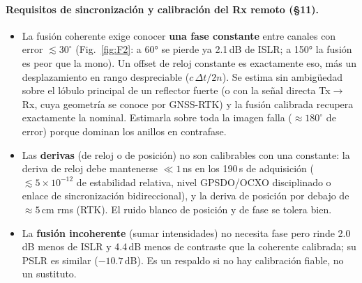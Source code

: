 \paragraph{Requisitos de sincronización y calibración del Rx remoto (§11).}
\begin{itemize}[itemsep=2pt]
  \item La fusión coherente exige conocer \textbf{una fase constante} entre
  canales con error $\lesssim30^{\circ}$ (Fig.~\ref{fig:F2}: a 60° se pierde ya
  2.1\,dB de ISLR; a 150° la fusión es peor que la mono). Un offset de reloj
  constante es exactamente eso, más un desplazamiento en rango despreciable
  ($c\,\Delta t/2n$). Se estima sin ambigüedad sobre el lóbulo principal de un
  reflector fuerte (o con la señal directa Tx$\to$Rx, cuya geometría se conoce por
  GNSS-RTK) y la fusión calibrada recupera exactamente la nominal. Estimarla sobre
  toda la imagen falla ($\approx180^{\circ}$ de error) porque dominan los anillos en
  contrafase.
  \item Las \textbf{derivas} (de reloj o de posición) no son calibrables con una
  constante: la deriva de reloj debe mantenerse $\ll1$\,ns en los 190\,s de
  adquisición ($\lesssim5\times10^{-12}$ de estabilidad relativa, nivel
  GPSDO/OCXO disciplinado o enlace de sincronización bidireccional), y la deriva de posición por debajo de $\approx5$\,cm rms
  (RTK). El ruido blanco de posición y de fase se tolera bien.
  \item La \textbf{fusión incoherente} (sumar intensidades) no necesita fase pero
  rinde 2.0\,dB menos de ISLR y 4.4\,dB menos de contraste que la coherente
  calibrada; su PSLR es similar ($-10.7$\,dB). Es un respaldo si no hay calibración
  fiable, no un sustituto.
\end{itemize}

